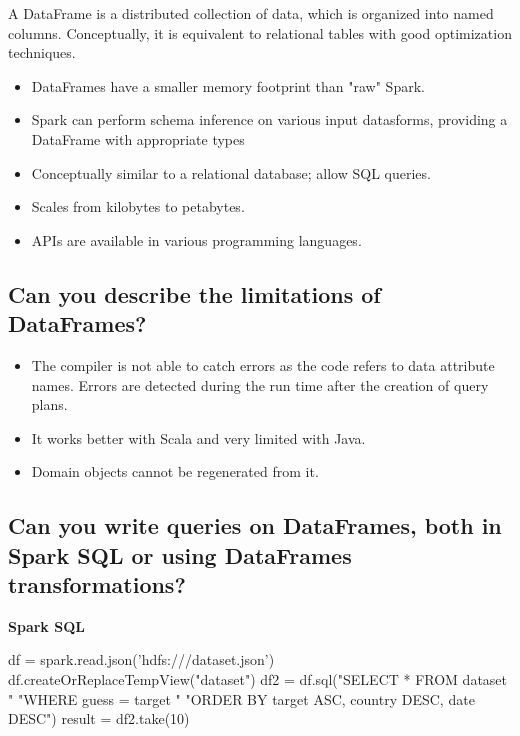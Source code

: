 \documentclass{article}
\begin{document}
A DataFrame is a distributed collection of data, which is organized into named columns. Conceptually, it is equivalent to relational tables with good optimization techniques.

\begin{itemize}
    \item DataFrames have a smaller memory footprint than "raw" Spark. 
    \item Spark can perform schema inference on various input datasforms, providing a DataFrame with appropriate types
    \item Conceptually similar to a relational database; allow SQL queries. 
    \item Scales from kilobytes to petabytes. 
    \item APIs are available in various programming languages. 
\end{itemize}


\subsection{Can you describe the limitations of DataFrames?}

\begin{itemize}
    \item The compiler is not able to catch errors as the code refers to data attribute names. Errors are detected during the run time after the creation of query plans.
    \item It works better with Scala and very limited with Java.
    \item Domain objects cannot be regenerated from it.
\end{itemize}

\subsection{Can you write queries on DataFrames, both in Spark SQL or using DataFrames transformations?}

\textbf{Spark SQL}

\begin{center}
\begin{listing}[H]
  \begin{python}
    df = spark.read.json('hdfs:///dataset.json')
    df.createOrReplaceTempView("dataset")
    df2 = df.sql("SELECT * FROM dataset " 
                 "WHERE guess = target "
                 "ORDER BY target ASC, country DESC, date DESC") 
    result = df2.take(10)
  \end{python}
\end{listing}
\end{center}
\end{document}
